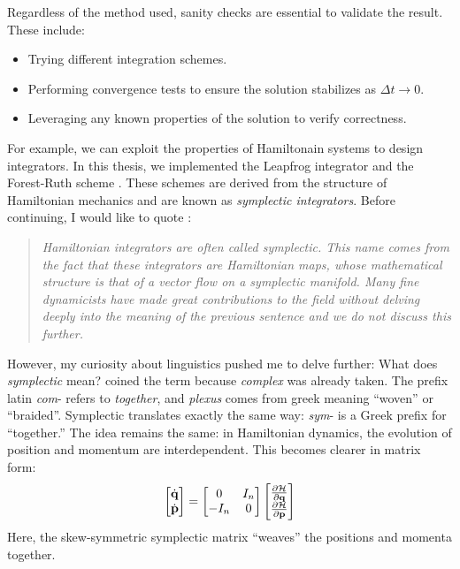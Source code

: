     Regardless of the method used, sanity checks are essential to validate the result. These include:
    \begin{itemize}
        \item Trying different integration schemes.
        \item Performing convergence tests to ensure the solution stabilizes as \( \Delta t \to 0 \).
        \item Leveraging any known properties of the solution to verify correctness.
    \end{itemize}
    For example, we can exploit the properties of Hamiltonain systems to design integrators. In this thesis, we implemented the Leapfrog integrator and the Forest-Ruth scheme \citep{bovy_inprep, 1990PhyD...43..105F}. These schemes are derived from the structure of Hamiltonian mechanics and are known as \textit{symplectic integrators}. Before continuing, I would like to quote \citep{bovy_inprep}:
    \begin{quote}
        \textit{Hamiltonian integrators are often called symplectic. This name comes from the fact that these integrators are Hamiltonian maps, whose mathematical structure is that of a vector flow on a symplectic manifold. Many fine dynamicists have made great contributions to the field without delving deeply into the meaning of the previous sentence and we do not discuss this further.}
    \end{quote}
    However, my curiosity about linguistics pushed me to delve further: What does \textit{symplectic} mean? \citet{weyl1946classical} coined the term because \textit{complex} was already taken. The prefix latin \textit{com}- refers to \textit{together}, and \textit{plexus} comes from greek meaning ``woven'' or ``braided''. Symplectic translates exactly the same way: \textit{sym}- is a Greek prefix for ``together.'' The idea remains the same: in Hamiltonian dynamics, the evolution of position and momentum are interdependent. This becomes clearer in matrix form:
    \begin{equation}
        \begin{bmatrix}
            \dot{\bf{q}}\\
            \dot{\bf{p}}
        \end{bmatrix}
         = 
        \begin{bmatrix}
            0 & I_n \\
            -I_n & 0 
        \end{bmatrix}
                \begin{bmatrix}
            \frac{\partial \mathcal{H}}{\partial \bf{q}} \\
            \frac{\partial \mathcal{H}}{\partial \bf{p}}
        \end{bmatrix}
        \label{eq:symplectic}
    \end{equation}
    Here, the skew-symmetric symplectic matrix ``weaves'' the positions and momenta together.

